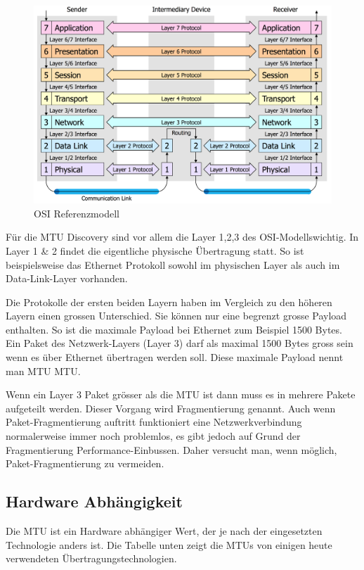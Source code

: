\begin{figure}[H]
    \begin{center}
        \includegraphics[trim=1 0 0 0,clip,width=\textwidth]{mainpart/analyse/img/OSI_Modell}
    \end{center}
    \caption{\ac{OSI} Referenzmodell}
\end{figure}

Für die \ac{MTU} Discovery sind vor allem die Layer 1,2,3 des \ac{OSI}-Modells\footnotemark[1] wichtig. In Layer 1 \& 2 findet die eigentliche physische Übertragung statt. So ist beispielsweise das Ethernet Protokoll sowohl im physischen Layer als auch im Data-Link-Layer vorhanden.

Die Protokolle der ersten beiden Layern haben im Vergleich zu den höheren Layern einen grossen Unterschied. Sie können nur eine begrenzt grosse Payload enthalten. So ist die maximale Payload bei Ethernet zum Beispiel 1500 Bytes. Ein Paket des Netzwerk-Layers (Layer 3) darf als maximal 1500 Bytes gross sein wenn es über Ethernet übertragen werden soll. Diese maximale Payload nennt man \acl{MTU} \acs{MTU}.


Wenn ein Layer 3 Paket grösser als die \ac{MTU} ist dann muss es in mehrere Pakete aufgeteilt werden. Dieser Vorgang wird Fragmentierung genannt. Auch wenn Paket-Fragmentierung auftritt funktioniert eine Netzwerkverbindung normalerweise immer noch problemlos, es gibt jedoch auf Grund der Fragmentierung Performance-Einbussen. Daher versucht man, wenn möglich, Paket-Fragmentierung zu vermeiden.

\subsection{Hardware Abhängigkeit}
Die \ac{MTU} ist ein Hardware abhängiger Wert, der je nach der eingesetzten Technologie anders ist. Die Tabelle unten zeigt die \ac{MTU}s von einigen heute verwendeten Übertragungstechnologien.

